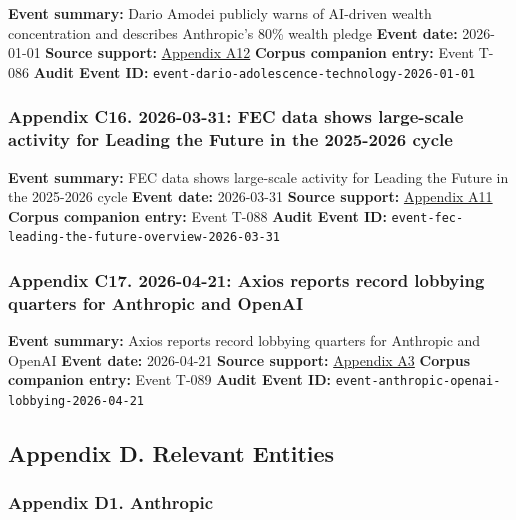 \documentclass[
  american,
  11pt,
  letterpaper,
]{article}
\begin{document}
\textbf{Event summary:} Dario Amodei publicly warns of AI-driven wealth
concentration and describes Anthropic's 80\% wealth pledge \textbf{Event
date:} 2026-01-01 \textbf{Source support:}
\hyperref[ch-08-appendix-a12-the-adolescence-of-technology]{Appendix
A12} \textbf{Corpus companion entry:} Event T-086 \textbf{Audit Event
ID:} \texttt{event-dario-adolescence-technology-2026-01-01}

\subsubsection{Appendix C16. 2026-03-31: FEC data shows large-scale
activity for Leading the Future in the 2025-2026
cycle}\label{ch-08-appendix-c16-2026-03-31-fec-data-shows-large-scale-activity-for-leading-the-future-in-the-2025-2026-cycle}

\textbf{Event summary:} FEC data shows large-scale activity for Leading
the Future in the 2025-2026 cycle \textbf{Event date:} 2026-03-31
\textbf{Source support:}
\hyperref[ch-08-appendix-a11-leading-the-future-committee-overview]{Appendix
A11} \textbf{Corpus companion entry:} Event T-088 \textbf{Audit Event
ID:} \texttt{event-fec-leading-the-future-overview-2026-03-31}

\subsubsection{Appendix C17. 2026-04-21: Axios reports record lobbying
quarters for Anthropic and
OpenAI}\label{ch-08-appendix-c17-2026-04-21-axios-reports-record-lobbying-quarters-for-anthropic-and-openai}

\textbf{Event summary:} Axios reports record lobbying quarters for
Anthropic and OpenAI \textbf{Event date:} 2026-04-21 \textbf{Source
support:}
\hyperref[ch-08-appendix-a3-anthropic-outspends-openai-in-biggest-ever-lobbying-quarter]{Appendix
A3} \textbf{Corpus companion entry:} Event T-089 \textbf{Audit Event
ID:} \texttt{event-anthropic-openai-lobbying-2026-04-21}

\subsection{Appendix D. Relevant
Entities}\label{appendix-d.-relevant-entities-8}

\subsubsection{Appendix D1.
Anthropic}\label{ch-08-appendix-d1-anthropic}
\end{document}
